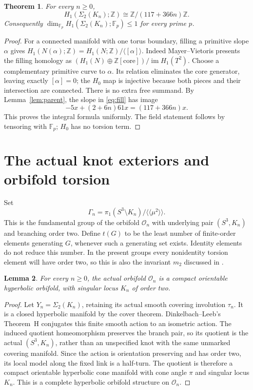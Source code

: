 \documentclass[11pt]{article}
\newtheorem{theorem}{Theorem}
\newtheorem{lemma}[theorem]{Lemma}
\newcommand{\Z}{\mathbb Z}
\newcommand{\F}{\mathbb F}
\newcommand{\Sig}{\Sigma_2}
\begin{document}
\begin{theorem}\label{thm:homology}
For every $n\ge0$,
\[
                H_1(\Sig(K_n);\Z)\cong\Z/(117+366n)\Z.
\]
Consequently $\dim_{\F_p}H_1(\Sig(K_n);\F_p)\le1$ for every prime $p$.
\end{theorem}
\begin{proof}
For a connected manifold with one torus boundary, filling a primitive
slope $\alpha$ gives $H_1(N(\alpha);\Z)=H_1(N;\Z)/\langle[\alpha]\rangle$.
Indeed Mayer--Vietoris presents the filling homology as
$(H_1(N)\oplus\Z[\text{core}])/\operatorname{im}H_1(T^2)$.
Choose a complementary primitive curve to $\alpha$. Its relation
eliminates the core generator, leaving exactly $[\alpha]=0$;
the $H_0$ map is injective because both pieces and their intersection
are connected. There is no extra free summand.
By Lemma~\ref{lem:parent}, the slope in \eqref{eq:fill} has image
\[
                    -5x+(2+6n)61x=(117+366n)x.
\]
This proves the integral formula uniformly. The field statement follows
by tensoring with $\F_p$; $H_0$ has no torsion term.
\end{proof}

\section{The actual knot exteriors and orbifold torsion}

Set
\[
 \Gamma_n=\pi_1(S^3\setminus K_n)/
                       \langle\!\langle\mu^2\rangle\!\rangle.
\]
This is the fundamental group of the orbifold $\mathcal O_n$ with
underlying pair $(S^3,K_n)$ and branching order two. Define
$t(G)$ to be the least number of finite-order elements generating
$G$, whenever such a generating set exists. Identity elements do
not reduce this number. In the present groups every nonidentity
torsion element will have order two, so this is also the invariant
$m_2$ discussed in \cite[Section~8]{bkn}.

\begin{lemma}\label{lem:orbifold}
For every $n\ge0$, the actual orbifold $\mathcal O_n$ is a compact
orientable hyperbolic orbifold, with singular locus $K_n$ of order two.
\end{lemma}
\begin{proof}
Let $Y_n=\Sig(K_n)$, retaining its actual smooth covering involution
$\tau_n$. It is a closed hyperbolic manifold by the cover theorem.
Dinkelbach--Leeb's Theorem~H \cite[pp.~1129, 1166--1167]{dl}
conjugates this finite smooth action to an isometric action.
The induced quotient homeomorphism preserves the branch pair, so its
quotient is the actual $(S^3,K_n)$, rather than an unspecified knot
with the same unmarked covering manifold. Since the action is
orientation preserving and has order two, its local model along the
fixed link is a half-turn. The quotient is therefore a compact
orientable hyperbolic cone manifold with cone angle $\pi$ and singular
locus $K_n$. This is a complete hyperbolic orbifold structure on
$\mathcal O_n$.
\end{proof}
\end{document}
